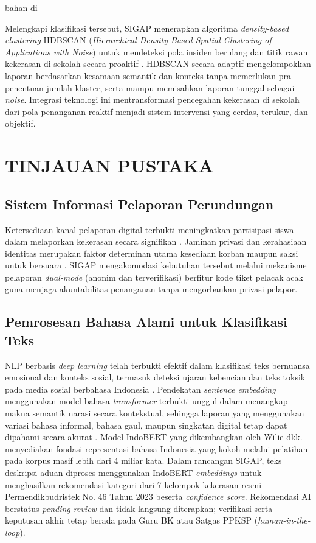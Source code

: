 bahan di\documentclass[conference]{IEEEtran}
\begin{document}
Melengkapi klasifikasi tersebut, SIGAP menerapkan algoritma \textit{density-based clustering} HDBSCAN (\textit{Hierarchical Density-Based Spatial Clustering of Applications with Noise}) untuk mendeteksi pola insiden berulang dan titik rawan kekerasan di sekolah secara proaktif \cite{grootendorst2022,malzer2020}. HDBSCAN secara adaptif mengelompokkan laporan berdasarkan kesamaan semantik dan konteks tanpa memerlukan pra-penentuan jumlah klaster, serta mampu memisahkan laporan tunggal sebagai \textit{noise}. Integrasi teknologi ini mentransformasi pencegahan kekerasan di sekolah dari pola penanganan reaktif menjadi sistem intervensi yang cerdas, terukur, dan objektif.

\section{TINJAUAN PUSTAKA}

\subsection{Sistem Informasi Pelaporan Perundungan}
Ketersediaan kanal pelaporan digital terbukti meningkatkan partisipasi siswa dalam melaporkan kekerasan secara signifikan \cite{evangelio2022}. Jaminan privasi dan kerahasiaan identitas merupakan faktor determinan utama kesediaan korban maupun saksi untuk bersuara \cite{kaloeti2021,kasturiratna2025}. SIGAP mengakomodasi kebutuhan tersebut melalui mekanisme pelaporan \textit{dual-mode} (anonim dan terverifikasi) berfitur kode tiket pelacak acak guna menjaga akuntabilitas penanganan tanpa mengorbankan privasi pelapor.

\subsection{Pemrosesan Bahasa Alami untuk Klasifikasi Teks}
NLP berbasis \textit{deep learning} telah terbukti efektif dalam klasifikasi teks bernuansa emosional dan konteks sosial, termasuk deteksi ujaran kebencian dan teks toksik pada media sosial berbahasa Indonesia \cite{nabiilah2024}. Pendekatan \textit{sentence embedding} menggunakan model bahasa \textit{transformer} terbukti unggul dalam menangkap makna semantik narasi secara kontekstual, sehingga laporan yang menggunakan variasi bahasa informal, bahasa gaul, maupun singkatan digital tetap dapat dipahami secara akurat \cite{wongso2023}. Model IndoBERT yang dikembangkan oleh Wilie dkk. \cite{wilie2020} menyediakan fondasi representasi bahasa Indonesia yang kokoh melalui pelatihan pada korpus masif lebih dari 4 miliar kata. Dalam rancangan SIGAP, teks deskripsi aduan diproses menggunakan IndoBERT \textit{embeddings} untuk menghasilkan rekomendasi kategori dari 7 kelompok kekerasan resmi Permendikbudristek No. 46 Tahun 2023 beserta \textit{confidence score}. Rekomendasi AI berstatus \textit{pending review} dan tidak langsung diterapkan; verifikasi serta keputusan akhir tetap berada pada Guru BK atau Satgas PPKSP (\textit{human-in-the-loop}).
\end{document}
